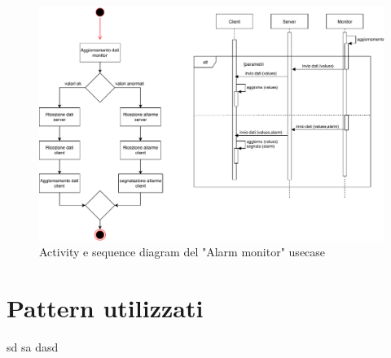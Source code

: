 \documentclass{article}
\begin{document}
\begin{figure}[H]

		\includegraphics[width=1.1\textwidth]{documenti/Diagrams_monitorAgg.pdf}
		\caption{Activity e sequence diagram del "Alarm monitor" usecase}
		\label{Diagrams_monitorAgg}

	\end{figure}


\vspace{2cm}


\section{Pattern utilizzati}


sd
sa
dasd
\end{document}
